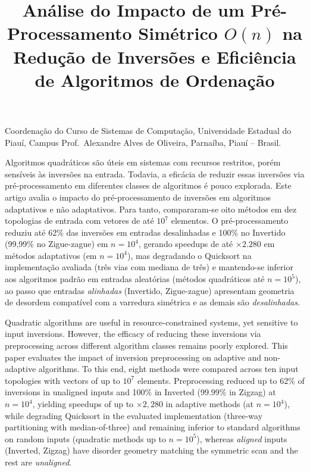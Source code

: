 \documentclass[portuguese]{sbc2025}%
\title[Pré-processamento simétrico para ordenação]{Análise do Impacto de um Pré-Processamento Simétrico $O(n)$ na Redução de Inversões e Eficiência de Algoritmos de Ordenação}
\author[Nascimento e Rocha 2026]{
\affil{\textbf{Samuel da Penha Nascimento}~[{Universidade Estadual do Piauí}~|\href{mailto:samuelpnascimentodev@gmail.com}{~{\textit{samuelpnascimentodev@gmail.com}}}~]}

\affil{\textbf{Francisco das Chagas Rocha}~[{Universidade Estadual do Piauí}~|\href{mailto:rocha@phb.uespi.br}{{\textit{rocha@phb.uespi.br}}}~]}

}
\begin{document}
\begin{frontmatter}

\maketitle

\begin{mail}
Coordenação do Curso de Sistemas de Computação, Universidade Estadual do Piauí, Campus Prof.\ Alexandre Alves de Oliveira, Parnaíba, Piauí -- Brasil.
\end{mail}

\begin{abstract-pt}
Algoritmos quadráticos são úteis em sistemas com recursos restritos, porém sensíveis às inversões na entrada. Todavia, a eficácia de reduzir essas inversões via pré-processamento em diferentes classes de algoritmos é pouco explorada. Este artigo avalia o impacto do pré-processamento de inversões em algoritmos adaptativos e não adaptativos. Para tanto, compararam-se oito métodos em dez topologias de entrada com vetores de até $10^7$ elementos. O pré-processamento reduziu até 62\% das inversões em entradas desalinhadas e 100\% no Invertido (99,99\% no Zigue-zague) em $n{=}10^4$, gerando speedups de até $\times 2.280$ em métodos adaptativos (em $n{=}10^4$), mas degradando o Quicksort na implementação avaliada (três vias com mediana de três) e mantendo-se inferior aos algoritmos padrão em entradas aleatórias (métodos quadráticos até $n{=}10^5$), ao passo que entradas \emph{alinhadas} (Invertido, Zigue-zague) apresentam geometria de desordem compatível com a varredura simétrica e as demais são \emph{desalinhadas}.
\end{abstract-pt}

\begin{abstract-en}
Quadratic algorithms are useful in resource-constrained systems, yet sensitive to input inversions. However, the efficacy of reducing these inversions via preprocessing across different algorithm classes remains poorly explored. This paper evaluates the impact of inversion preprocessing on adaptive and non-adaptive algorithms. To this end, eight methods were compared across ten input topologies with vectors of up to $10^7$ elements. Preprocessing reduced up to 62\% of inversions in unaligned inputs and 100\% in Inverted (99.99\% in Zigzag) at $n{=}10^4$, yielding speedups of up to $\times 2{,}280$ in adaptive methods (at $n{=}10^4$), while degrading Quicksort in the evaluated implementation (three-way partitioning with median-of-three) and remaining inferior to standard algorithms on random inputs (quadratic methods up to $n{=}10^5$), whereas \emph{aligned} inputs (Inverted, Zigzag) have disorder geometry matching the symmetric scan and the rest are \emph{unaligned}.
\end{abstract-en}


\end{frontmatter}
\end{document}
